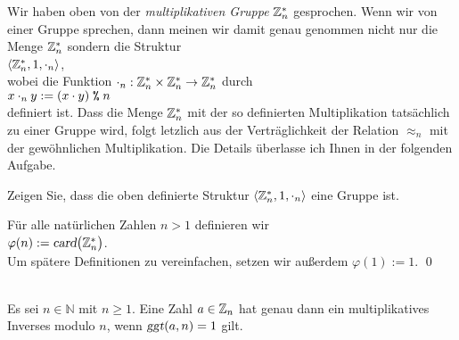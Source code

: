 \remark
Wir haben oben von der \emph{multiplikativen Gruppe} $\mathbb{Z}_{n}^*$ gesprochen.  Wenn wir von
einer Gruppe sprechen, dann meinen wir damit genau genommen nicht nur die Menge $\mathbb{Z}_{n}^*$
sondern die Struktur 
\\[0.2cm]
\hspace*{1.3cm}
$\langle \mathbb{Z}_{n}^*, 1, \cdot_n \rangle$,
\\[0.2cm]
wobei die Funktion $\cdot_n : \mathbb{Z}_{n}^* \times \mathbb{Z}_{n}^* \rightarrow \mathbb{Z}_{n}^*$ durch 
\\[0.2cm]
\hspace*{1.3cm}
$x \cdot_n y := (x \cdot y) \;\texttt{\%}\; n$
\\[0.2cm]
definiert ist.  Dass die Menge $\mathbb{Z}_{n}^*$ mit der so definierten Multiplikation tatsächlich
zu einer Gruppe wird, folgt letzlich aus der Verträglichkeit der Relation $\approx_n$ mit der
gewöhnlichen Multiplikation.  Die Details überlasse ich Ihnen in der folgenden Aufgabe.

\exercise
Zeigen Sie, dass die oben definierte Struktur $\langle \mathbb{Z}_{n}^*, 1, \cdot_n \rangle$
eine Gruppe ist.


\begin{Definition} Für alle natürlichen Zahlen $n > 1$ definieren wir
\\[0.2cm]
\hspace*{1.3cm}
$\varphi(n) := \textsl{card}\bigl(\mathbb{Z}_{n}^*\bigr)$.
\\[0.2cm]
Um spätere Definitionen zu vereinfachen,  setzen wir außerdem $\varphi(1) := 1$. \qed
\end{Definition}

\begin{Satz} 
  \label{satz:multiplikatives-inverses}
  \hspace*{\fill} \\
  Es sei $n \in \mathbb{N}$ mit $n \geq 1$.
  Eine Zahl $a \in \mathbb{Z}_{n}$ hat genau dann ein multiplikatives Inverses modulo $n$, wenn
  $\textsl{ggt}(a, n) = 1$ gilt.
\end{Satz}

